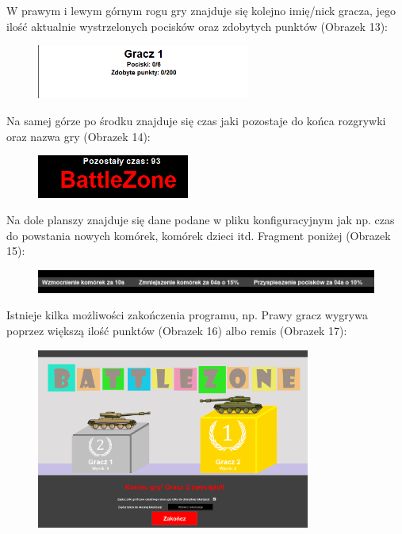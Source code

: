 \documentclass{article}
\begin{document}
W prawym i lewym górnym rogu gry znajduje się kolejno imię/nick gracza, jego ilość aktualnie wystrzelonych pocisków oraz zdobytych punktów (Obrazek 13):
\begin{figure} [hbt!]
    \centering
    \includegraphics[width=7cm]{menu_gracza.png}
\end{figure}
\newline Na samej górze po środku znajduje się czas jaki pozostaje do końca rozgrywki oraz nazwa gry (Obrazek 14):
\begin{figure} [hbt!]
    \centering
    \includegraphics[width=5cm]{czas_do_konca.png}
\end{figure}
\newpage
Na dole planszy znajduje się dane podane w pliku konfiguracyjnym jak np. czas do powstania nowych komórek, komórek dzieci itd. Fragment poniżej 
(Obrazek 15):
\begin{figure} [hbt!]
    \centering
    \includegraphics[width=12cm]{pasek.png}
\end{figure}
\newline Istnieje kilka możliwości zakończenia programu, np. Prawy gracz wygrywa poprzez większą ilość punktów (Obrazek 16) albo remis (Obrazek 17):
\begin{figure} [hbt!]
    \centering
    \includegraphics[width=9cm]{koniec_1.png}
\end{figure}
\end{document}
